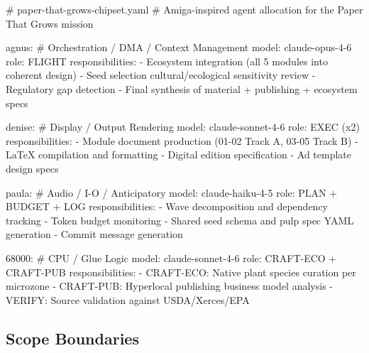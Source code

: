 \documentclass[11pt,letterpaper]{article}
\begin{document}
\begin{asciibox}
# paper-that-grows-chipset.yaml
# Amiga-inspired agent allocation for the Paper That Grows mission

agnus:   # Orchestration / DMA / Context Management
  model: claude-opus-4-6
  role: FLIGHT
  responsibilities:
    - Ecosystem integration (all 5 modules into coherent design)
    - Seed selection cultural/ecological sensitivity review
    - Regulatory gap detection
    - Final synthesis of material + publishing + ecosystem specs

denise:  # Display / Output Rendering
  model: claude-sonnet-4-6
  role: EXEC (x2)
  responsibilities:
    - Module document production (01-02 Track A, 03-05 Track B)
    - LaTeX compilation and formatting
    - Digital edition specification
    - Ad template design specs

paula:   # Audio / I-O / Anticipatory
  model: claude-haiku-4-5
  role: PLAN + BUDGET + LOG
  responsibilities:
    - Wave decomposition and dependency tracking
    - Token budget monitoring
    - Shared seed schema and pulp spec YAML generation
    - Commit message generation

68000:   # CPU / Glue Logic
  model: claude-sonnet-4-6
  role: CRAFT-ECO + CRAFT-PUB
  responsibilities:
    - CRAFT-ECO: Native plant species curation per microzone
    - CRAFT-PUB: Hyperlocal publishing business model analysis
    - VERIFY: Source validation against USDA/Xerces/EPA
\end{asciibox}

\subsection{Scope Boundaries}
\end{document}
